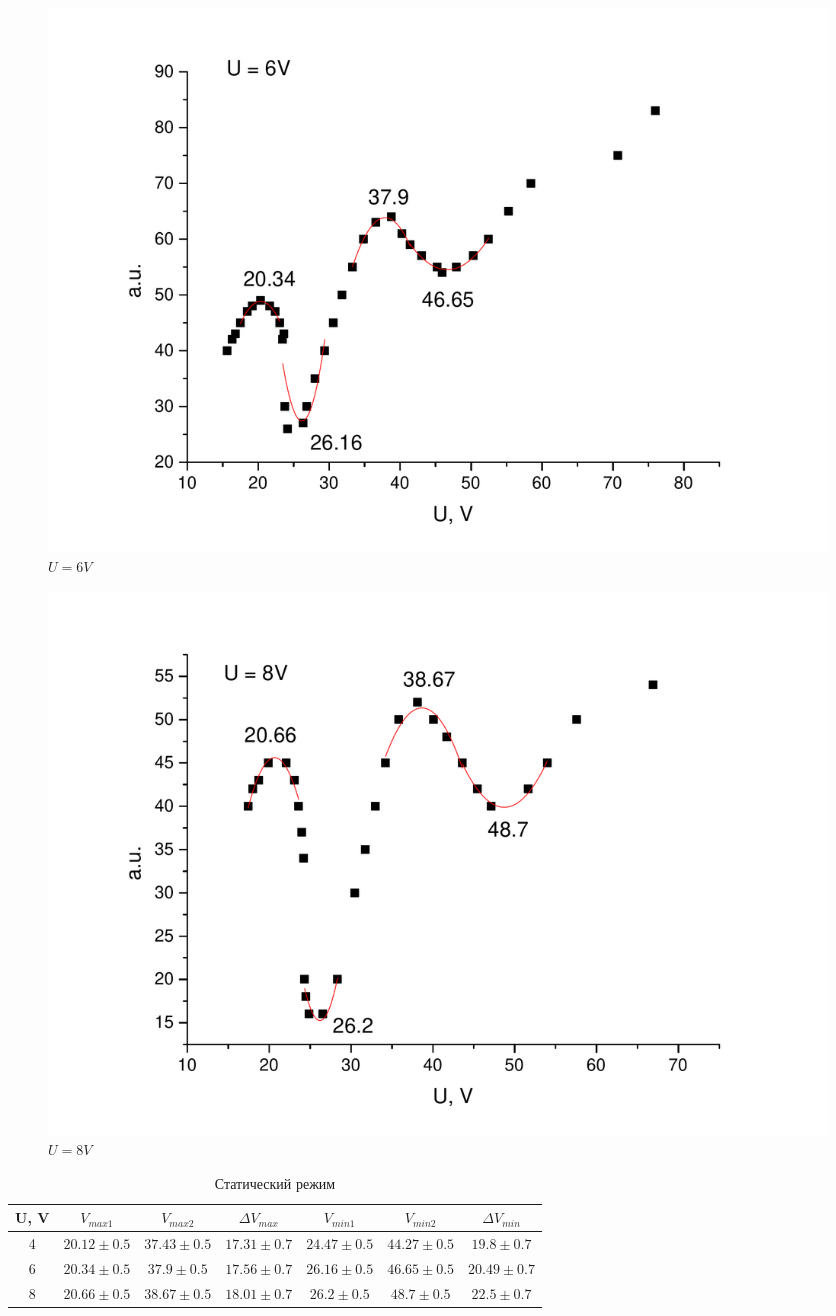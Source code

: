 \documentclass[a4paper,12pt]{article}
\begin{document}
		\begin{figure}[h!]
			\includegraphics[width=0.95\linewidth]{6V}
			\caption{$U = 6V$}
		\end{figure}
		
		\begin{figure}[h!]
			\includegraphics[width=0.95\linewidth]{8V}
			\caption{$U = 8V$}
		\end{figure}
		
		\begin{table}[h!]
			\centering
			\caption{Статический режим}
			\label{my-label}
			\begin{tabular}{|c|c|c|c|c|c|c|}
				\hline
				U, V & $V_{max1}$ & $V_{max2}$ & $\Delta V_{max}$ & $V_{min1}$ & $V_{min2}$ & $\Delta V_{min}$ \\ \hline
				4    & $20.12 \pm 0.5$      & $37.43 \pm 0.5$       & $17.31 \pm 0.7$            & $24.47 \pm 0.5$     & $44.27 \pm 0.5$      & $19.8 \pm 0.7$           \\ \hline
				6    & $20.34 \pm 0.5$      & $37.9 \pm 0.5$     & $17.56 \pm 0.7$           & $26.16 \pm 0.5$     & $46.65 \pm 0.5$      & $20.49 \pm 0.7$            \\ \hline
				8    & $20.66 \pm 0.5$     & $38.67 \pm 0.5$     & $18.01 \pm 0.7$           & $26.2 \pm 0.5$     & $48.7 \pm 0.5$       & $22.5 \pm 0.7$           \\ \hline
			\end{tabular}
		\end{table}
		
\end{document}
